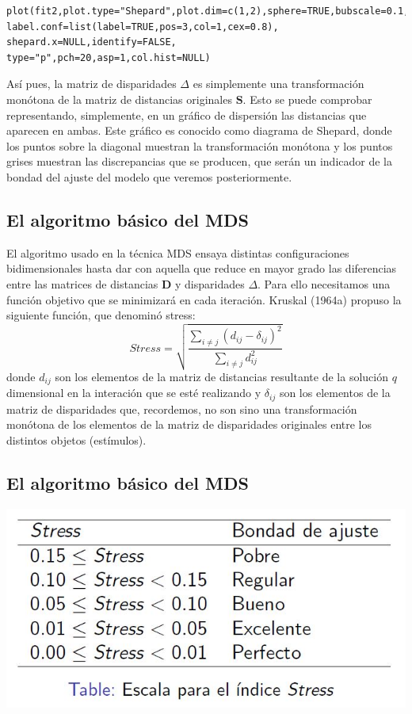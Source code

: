 \documentclass[]{article}
\begin{document}
\hypertarget{right}{}
\begin{verbatim}
plot(fit2,plot.type="Shepard",plot.dim=c(1,2),sphere=TRUE,bubscale=0.1,col=1,
label.conf=list(label=TRUE,pos=3,col=1,cex=0.8),
shepard.x=NULL,identify=FALSE,
type="p",pch=20,asp=1,col.hist=NULL)
\end{verbatim}

Así pues, la {matriz de disparidades \(\Delta\)} es simplemente una
{transformación monótona de la matriz de distancias originales
\(\textbf{S}\)}. Esto se puede comprobar representando, simplemente, en
un {gráfico de dispersión las distancias que aparecen en ambas}. Este
gráfico es conocido como {diagrama de Shepard}, donde los {puntos sobre
la diagonal} muestran la {transformación monótona} y los {puntos grises}
muestran las {discrepancias que se producen}, que serán un {indicador de
la bondad del ajuste} del modelo que veremos posteriormente.

\subsection{El algoritmo básico del
MDS}\label{el-algoritmo-buxe1sico-del-mds-5}

El algoritmo usado en la técnica MDS ensaya distintas configuraciones
bidimensionales hasta dar con aquella que {reduce en mayor grado las
diferencias entre las matrices de distancias \(\textbf{D}\) y
disparidades \(\Delta\)}. Para ello necesitamos una función objetivo que
se minimizará en cada iteración. Kruskal (1964a) propuso la siguiente
función, que denominó stress:
\[Stress=\sqrt{\frac{\sum_{i \neq j} (d_{ij}-\delta_{ij})^2}{\sum_{i \neq j} d^2_{ij}}}\]
donde {\(d_{ij}\)} son los {elementos de la matriz de distancias}
resultante de la solución \(q\) dimensional en la interación que se esté
realizando y {\(\delta_{ij}\)} son los {elementos de la matriz de
disparidades} que, recordemos, no son sino una transformación monótona
de los elementos de la matriz de disparidades originales entre los
distintos objetos (estímulos).

\subsection{El algoritmo básico del
MDS}\label{el-algoritmo-buxe1sico-del-mds-6}

\hypertarget{left}{}
\includegraphics[width=1\linewidth]{images/stress}
\end{document}
